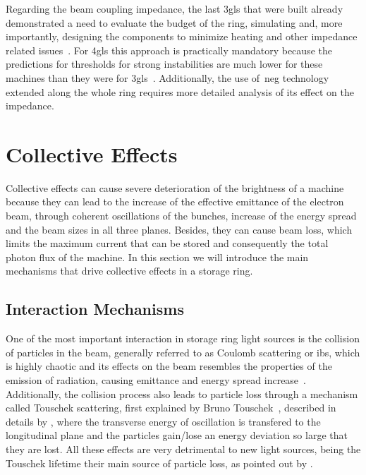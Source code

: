     Regarding the beam coupling impedance, the last \gls{3gls} that were built already demonstrated a need to evaluate the budget of the ring, simulating and, more importantly, designing the components to minimize heating and other impedance related issues~\cite{Nagaoka2004a,Gunzel2008,Blednykh2007,Blednykh2009}. For \gls{4gls} this approach is practically mandatory because the predictions for thresholds for strong instabilities are much lower for these machines than they were for \gls{3gls}~\cite{Klein2013a,Lindberg2015,Persichelli2017a,Wang2017,Wang2017a}.
    Additionally, the use of~\gls{neg} technology extended along the whole ring requires more detailed analysis of its effect on the impedance.

\section{Collective Effects}

    Collective effects can cause severe deterioration of the brightness of a machine because they can lead to the increase of the effective emittance of the electron beam, through coherent oscillations of the bunches, increase of the energy spread and the beam sizes in all three planes. Besides, they can cause beam loss, which limits the maximum current that can be stored and consequently the total photon flux of the machine. In this section we will introduce the main mechanisms that drive collective effects in a storage ring.

\subsection{Interaction Mechanisms}

    One of the most important interaction in storage ring light sources is the collision of particles in the beam, generally referred to as Coulomb scattering or \gls{ibs}, which is highly chaotic and its effects on the beam resembles the properties of the emission of radiation, causing emittance and energy spread increase~\cite{Piwinski1974,Bjorken1983,Kubo2001}. Additionally, the collision process also leads to particle loss through a mechanism called Touschek scattering, first explained by Bruno Touschek~\cite{Bernardini1963}, described in details by , where the transverse energy of oscillation is transfered to the longitudinal plane and the particles gain/lose an energy deviation so large that they are lost. All these effects are very detrimental to new light sources, being the Touschek lifetime their main source of particle loss, as pointed out by .

